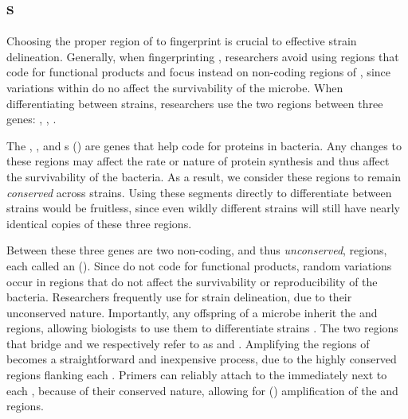 \subsection{\ITSlong{}s}\label{sec:its}
Choosing the proper region of \dna{} to fingerprint is crucial to effective strain delineation.
Generally, when fingerprinting \fib{}, researchers avoid using regions that code for functional products and focus instead on non-coding regions of \dna{}, since variations within do no affect the survivability of the microbe.
When differentiating between \ecoli{} strains, researchers use the two \itsshort{} regions between three genes: \Gsixt{}, \Gtwen{}, \Gfive{}.

The \Gsixt{}, \Gtwen{}, and \Gfive{} \rrnalong{}s (\rrna{}) are genes that help code for proteins in \ecoli{} bacteria.
\index{\Gsixt{}}
\index{\Gtwen{}}
\index{\Gfive{}}
\index{\rrna{}}
\index{\rrnalong{}}
Any changes to these regions may affect the rate or nature of protein synthesis and thus affect the survivability of the bacteria.
As a result, we consider these regions to remain \textit{conserved} across \ecoli{} strains.
Using these segments directly to differentiate between strains would be fruitless, since even wildly different \ecoli{} strains will still have nearly identical copies of these three regions.

Between these three genes are two non-coding, and thus \textit{unconserved}, regions, each called an \itslong{} (\itsshort{}).
\index{\itslong{}}
\index{\itsshort{}}
Since \itsshort{} do not code for functional products, random variations occur in \itsshort{} regions that do not affect the survivability or reproducibility of the bacteria.
Researchers frequently use \itsshort{} for strain delineation, due to their unconserved nature.
Importantly, any offspring of a microbe inherit the \Ssixt{} and \Sfive{} regions, allowing biologists to use them to differentiate strains \cite{SolimanDVMBNWKG12}.
The two \itsshort{} regions that bridge \Ssixtname{} and \Sfivename{} we respectively refer to as \Ssixt{} and \Sfive{}.
\index{\Ssixtname{}}
\index{\Sfivename{}}
\index{\Ssixt{}}
\index{\Sfive{}}
Amplifying the \itsshort{} regions of \dna{} becomes a straightforward and inexpensive process, due to the highly conserved regions flanking each \itsshort{}.
Primers can reliably attach to the \rrna{} immediately next to each \itsshort{}, because of their conserved nature, allowing for \pcrlong{} (\pcr{}) amplification of the \Ssixt{} and \Sfive{} regions.
\index{\pcrlong{}}
\index{\pcr{}}

